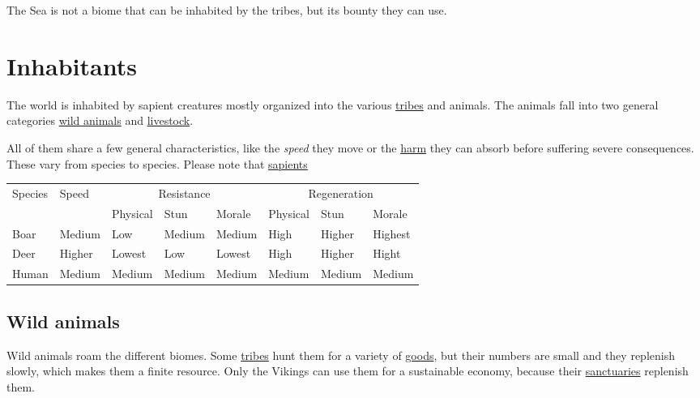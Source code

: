The \gls*{Sea} is not a biome that can be inhabited by the tribes, but its
bounty they can use.

\printglossary[type=biome, title=Biome-Glossary]{}\label{ch:World:BiomesGlossary}

\section{Inhabitants}\label{ch:World:Inhabitants}

The world is inhabited by sapient creatures mostly organized into the various
\hyperref[ch:Tribes]{tribes} and animals. The animals fall into two general
categories \hyperref[ch:World:Inhabitants:Animals]{wild animals} and
\hyperref[ch:World:Inhbitants:Livestock]{livestock}.

All of them share a few general characteristics, like the \emph{speed} they
move or the \hyperref[ch:Conflict:Combat]{harm} they can absorb before
suffering severe consequences. These vary from species to species. Please note
that \hyperref[ch:World:Inhabitants:Sapients]{sapients}

\begin{longtable}{l l lll lll}
	\toprule
	Species    & Speed  & \multicolumn{3}{c}{Resistance} & \multicolumn{3}{c}{Regeneration}                                        \\
	           &        & Physical                       & Stun                             & Morale & Physical & Stun   & Morale  \\
	\midrule
	\Gls{Boar} & Medium & Low                            & Medium                           & Medium & High     & Higher & Highest \\
	\Gls{Deer} & Higher & Lowest                         & Low                              & Lowest & High     & Higher & Hight   \\
	Human      & Medium & Medium                         & Medium                           & Medium & Medium   & Medium & Medium  \\
	\bottomrule
\end{longtable}

\subsection{Wild animals}\label{ch:World:Inhabitants:Animals}

Wild animals roam the different biomes. Some \hyperref[ch:Tribes]{tribes} hunt
them for a variety of \hyperref[ch:Goods:Nature:Animals]{goods}, but their
numbers are small and they replenish slowly, which makes them a finite
resource. Only the \gls{Vikings} can use them for a sustainable economy,
because their \hyperref[ch:Tribes:Vikings:Religion:Forest]{sanctuaries}
replenish them.

